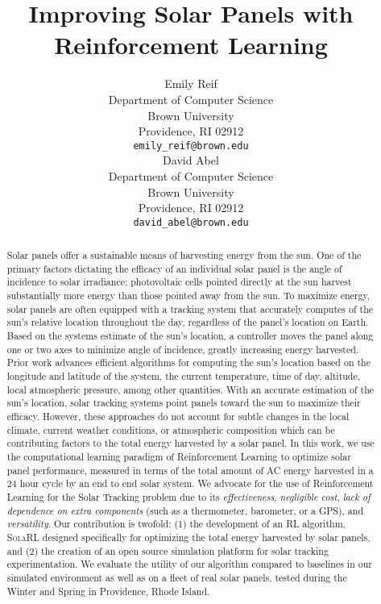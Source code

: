 \documentclass[11pt]{article}
\title{Improving Solar Panels with Reinforcement Learning}
\author{
Emily Reif \\
Department of Computer Science\\
Brown University\\
Providence, RI 02912 \\
\texttt{emily\_reif@brown.edu} \\
\And
David Abel \\
Department of Computer Science\\
Brown University \\
Providence, RI 02912 \\
\texttt{david\_abel@brown.edu} \\
}
\date{}
\begin{document}
\maketitle

\begin{abstract}
Solar panels offer a sustainable means of harvesting energy from the sun. One of the primary factors dictating the efficacy of an individual solar panel is the angle of incidence to solar irradiance; photovoltaic cells pointed directly at the sun harvest substantially more energy than those pointed away from the sun. To maximize energy, solar panels are often equipped with a tracking system that accurately computes of the sun's relative location throughout the day, regardless of the panel's location on Earth. Based on the systems estimate of the sun's location, a controller moves the panel along one or two axes to minimize angle of incidence, greatly increasing energy harvested. Prior work advances efficient algorithms for computing the sun's location based on the longitude and latitude of the system, the current temperature, time of day, altitude, local atmospheric pressure, among other quantities. With an accurate estimation of the sun's location, solar tracking systems point panels toward the sun to maximize their efficacy. However, these approaches do not account for subtle changes in the local climate, current weather conditions, or atmospheric composition which can be contributing factors to the total energy harvested by a solar panel. In this work, we use the computational learning paradigm of Reinforcement Learning to optimize solar panel performance, measured in terms of the total amount of AC energy harvested in a 24 hour cycle by an end to end solar system. We advocate for the use of Reinforcement Learning for the Solar Tracking problem due to its {\it effectiveness}, {\it negligible cost}, {\it lack of dependence on extra components} (such as a thermometer, barometer, or a GPS), and {\it versatility}. Our contribution is twofold: (1) the development of an RL algorithm, \textsc{SolaRL} designed specifically for optimizing the total energy harvested by solar panels, and (2) the creation of an open source simulation platform for solar tracking experimentation. We evaluate the utility of our algorithm compared to baselines in our simulated environment as well as on a fleet of real solar panels, tested during the Winter and Spring in Providence, Rhode Island.
\end{abstract}
\end{document}
